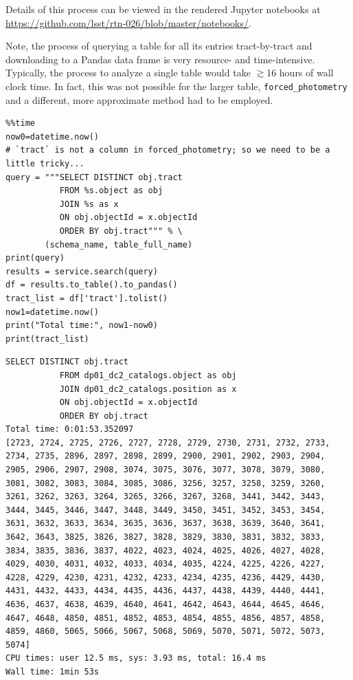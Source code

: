 \documentclass[DM,authoryear,toc]{lsstdoc}
\newenvironment{allintypewriter}{\ttfamily}{\par}
\begin{document}
Details of this process can be viewed in the rendered Jupyter notebooks at
\url{https://github.com/lsst/rtn-026/blob/master/notebooks/}.


Note, the process of querying a table for all its entries tract-by-tract and downloading to a Pandas data frame is very resource- and time-intensive.  Typically, the process to analyze a single table would take $\gtrsim$16 hours of wall clock time.  In fact, this was not possible for the larger table, \texttt{forced\_photometry} and a different, more approximate method had to be employed.


\lstset{language=Python}
\begin{lstlisting}
%%time
now0=datetime.now()
# `tract` is not a column in forced_photometry; so we need to be a little tricky...
query = """SELECT DISTINCT obj.tract 
           FROM %s.object as obj
           JOIN %s as x
           ON obj.objectId = x.objectId  
           ORDER BY obj.tract""" % \
        (schema_name, table_full_name)
print(query)
results = service.search(query)
df = results.to_table().to_pandas()
tract_list = df['tract'].tolist()
now1=datetime.now()
print("Total time:", now1-now0)
print(tract_list)
\end{lstlisting}


\lstset{language=sh}
\begin{lstlisting}
SELECT DISTINCT obj.tract 
           FROM dp01_dc2_catalogs.object as obj
           JOIN dp01_dc2_catalogs.position as x
           ON obj.objectId = x.objectId  
           ORDER BY obj.tract
Total time: 0:01:53.352097
[2723, 2724, 2725, 2726, 2727, 2728, 2729, 2730, 2731, 2732, 2733, 2734, 2735, 2896, 2897, 2898, 2899, 2900, 2901, 2902, 2903, 2904, 2905, 2906, 2907, 2908, 3074, 3075, 3076, 3077, 3078, 3079, 3080, 3081, 3082, 3083, 3084, 3085, 3086, 3256, 3257, 3258, 3259, 3260, 3261, 3262, 3263, 3264, 3265, 3266, 3267, 3268, 3441, 3442, 3443, 3444, 3445, 3446, 3447, 3448, 3449, 3450, 3451, 3452, 3453, 3454, 3631, 3632, 3633, 3634, 3635, 3636, 3637, 3638, 3639, 3640, 3641, 3642, 3643, 3825, 3826, 3827, 3828, 3829, 3830, 3831, 3832, 3833, 3834, 3835, 3836, 3837, 4022, 4023, 4024, 4025, 4026, 4027, 4028, 4029, 4030, 4031, 4032, 4033, 4034, 4035, 4224, 4225, 4226, 4227, 4228, 4229, 4230, 4231, 4232, 4233, 4234, 4235, 4236, 4429, 4430, 4431, 4432, 4433, 4434, 4435, 4436, 4437, 4438, 4439, 4440, 4441, 4636, 4637, 4638, 4639, 4640, 4641, 4642, 4643, 4644, 4645, 4646, 4647, 4648, 4850, 4851, 4852, 4853, 4854, 4855, 4856, 4857, 4858, 4859, 4860, 5065, 5066, 5067, 5068, 5069, 5070, 5071, 5072, 5073, 5074]
CPU times: user 12.5 ms, sys: 3.93 ms, total: 16.4 ms
Wall time: 1min 53s
\end{lstlisting}
\end{document}
